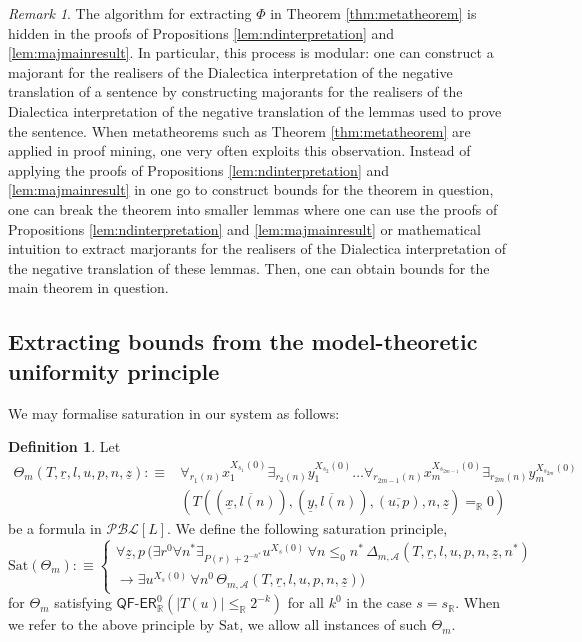 \documentclass[11pt]{amsart}
\theoremstyle{definition}
\newtheorem{definition}[theorem]{Definition}
\theoremstyle{remark}
\newtheorem{remark}[theorem]{Remark}
\def\RR{\mathbb{R}}
\newcommand{\QFER}{\textsf{QF}\mbox{-}\textsf{ER}}
\begin{document}
\begin{remark}
\label{rem:how:to:use}
    The algorithm for extracting $\Phi$ in Theorem \ref{thm:metatheorem} is hidden in the proofs of Propositions \ref{lem:ndinterpretation} and \ref{lem:majmainresult}. In particular, this process is modular: one can construct a majorant for the realisers of the Dialectica interpretation of the negative translation of a sentence by constructing majorants  for the realisers of the Dialectica interpretation of the negative translation of the lemmas used to prove the sentence. When metatheorems such as Theorem \ref{thm:metatheorem} are applied in proof mining, one very often exploits this observation. Instead of applying the proofs of Propositions \ref{lem:ndinterpretation} and \ref{lem:majmainresult} in one go to construct bounds for the theorem in question, one can break the theorem into smaller lemmas where one can use the proofs of Propositions \ref{lem:ndinterpretation} and \ref{lem:majmainresult} or mathematical intuition to extract marjorants for the realisers of the Dialectica interpretation of the negative translation of these lemmas. Then, one can obtain bounds for the main theorem in question.
\end{remark}



 


\subsection{Extracting bounds from the model-theoretic uniformity principle}
\label{sec:quant:proof}
We may formalise saturation in our system as follows:
\begin{definition}
 Let
 \begin{align*}
\Theta_m(T,\underline{r},l,u,p,n,\underline{z}):\equiv &\forall_{r_1(n)} x_1^{X_{s_1}(0)} \exists_{r_2(n)} y_1^{X_{s_2}(0)} \ldots \forall_{r_{2m-1}(n)} x_m^{X_{s_{2m-1}}(0)}\exists_{r_{2m}(n)} y_m^{X_{s_{2m}}(0)}\\&(T((\overline{\underline{x},l(n)}),(\overline{\underline{y},l(n)}),(\overline{u,p}),n,\underline{z})=_\RR 0)
\end{align*}
be a formula in $\mathcal{PBL}[L]$. We define the following saturation principle, 
\[
 \mathrm{Sat}(\Theta_m):\equiv
\begin{cases}
      \forall \underline{z},p\,(\exists r^0\forall n^*\exists_{P(r)+2^{-n^*}}u^{X_s(0)}\, \forall n\le_0 n^*\, \Delta_{m,\mathcal{A}}(T,\underline{r},l,u,p,n,\underline{z},n^*)\\\to\exists u^{X_s(0)}\, \forall n^0\, \Theta_{m,\mathcal{A}}(T,\underline{r},l,u,p,n,\underline{z})) 
\end{cases}
\] 
for $\Theta_m$ satisfying $\QFER^0_\RR(|T(u)|\le_\RR  2^{-k})$ for all $k^0$ in the case $s=s_\RR$. When we refer to the above principle by $\mathrm{Sat}$, we allow all instances of such $\Theta_m$.
\end{definition}
\end{document}
